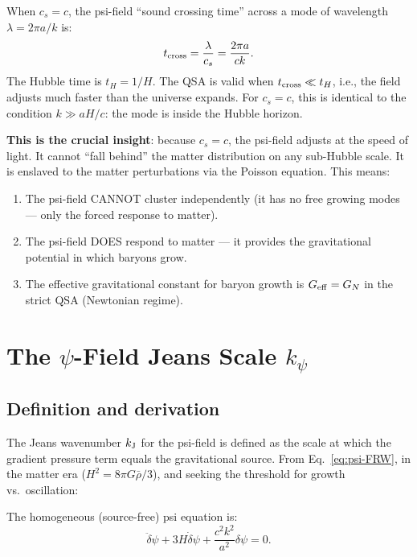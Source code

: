 \documentclass[aps,prd,twocolumn,nofootinbib]{revtex4-2}
\newcommand{\dpsi}{\delta\psi}
\newcommand{\Geff}{G_{\rm eff}}
\newcommand{\kpsi}{k_\psi}
\newcommand{\kJ}{k_{\rm J}}
\begin{document}
When $c_s = c$, the psi-field ``sound crossing time'' across a mode
of wavelength $\lambda = 2\pi a/k$ is:
\begin{equation}
t_{\rm cross} = \frac{\lambda}{c_s} = \frac{2\pi a}{ck}.
\end{equation}
The Hubble time is $t_H = 1/H$. The QSA is valid when
$t_{\rm cross} \ll t_H$, i.e., the field adjusts much faster than
the universe expands. For $c_s = c$, this is identical to the condition
$k \gg aH/c$: the mode is inside the Hubble horizon.

\textbf{This is the crucial insight}: because $c_s = c$, the psi-field
adjusts at the speed of light. It cannot ``fall behind'' the matter
distribution on any sub-Hubble scale. It is enslaved to the matter
perturbations via the Poisson equation. This means:

\begin{enumerate}
\item The psi-field CANNOT cluster independently (it has no free
  growing modes --- only the forced response to matter).
\item The psi-field DOES respond to matter --- it provides the
  gravitational potential in which baryons grow.
\item The effective gravitational constant for baryon growth is
  $\Geff = G_N$ in the strict QSA (Newtonian regime).
\end{enumerate}


\section{The $\psi$-Field Jeans Scale $\kpsi$}
\label{sec:Jeans}

\subsection{Definition and derivation}

The Jeans wavenumber $\kJ$ for the psi-field is defined as the scale
at which the gradient pressure term equals the gravitational source.
From Eq.~\eqref{eq:psi-FRW}, in the matter era ($H^2 = 8\pi G
\bar\rho/3$), and seeking the threshold for growth vs.\ oscillation:

The homogeneous (source-free) psi equation is:
\begin{equation}
\ddot\dpsi + 3H\dot\dpsi + \frac{c^2 k^2}{a^2}\dpsi = 0.
\end{equation}
\end{document}
